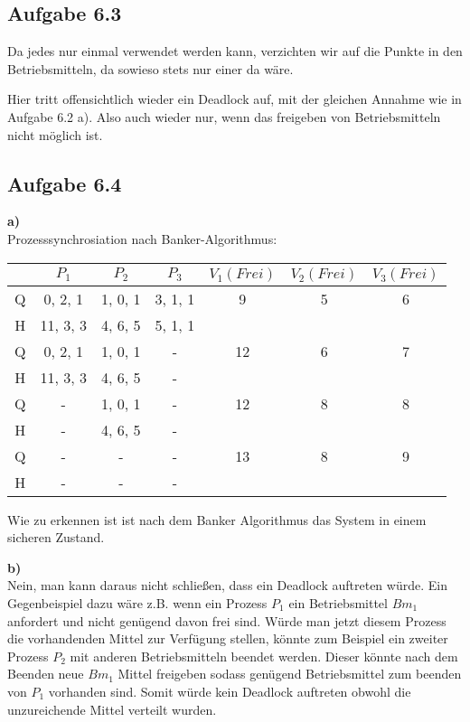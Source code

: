 \documentclass[a4paper,graphics,11pt]{article}
\newcommand{\aufgabe}[1]{\subsection*{Aufgabe #1}}
\begin{document}
\aufgabe{6.3}

Da jedes nur einmal verwendet werden kann, verzichten wir auf die Punkte in den Betriebsmitteln, da sowieso stets nur einer da wäre.


Hier tritt offensichtlich wieder ein Deadlock auf, mit der gleichen Annahme wie in Aufgabe 6.2 a). Also auch wieder nur, wenn das freigeben von Betriebsmitteln nicht möglich ist.
\newpage
\aufgabe{6.4}
\textbf{a)}\\
Prozesssynchrosiation nach Banker-Algorithmus:\\
\begin{tabular}{|c|c|c|c|c|c|c|}\hline
    & $P_1$ & $P_2$ & $P_3$ & $V_1(Frei)$ & $V_2(Frei)$ & $V_3(Frei)$\\ \hline
   Q & 0, 2, 1 & 1, 0, 1 & 3, 1, 1 & 9 & 5 & 6\\
   H & 11, 3, 3 & 4, 6, 5 & 5, 1, 1&&&\\ \hline
   Q & 0, 2, 1 & 1, 0, 1 & - & 12 & 6 & 7\\
   H & 11, 3, 3 & 4, 6, 5 & - &&&\\ \hline
   Q & - & 1, 0, 1 & - & 12 & 8 & 8\\
   H & - & 4, 6, 5 & - &&&\\ \hline
   Q & - & - & - & 13 & 8 & 9\\
   H & - & - & - &&&\\ \hline
\end{tabular}

Wie zu erkennen ist ist nach dem Banker Algorithmus das System in einem sicheren Zustand. 
\newline
\newline

\textbf{b)}\\
Nein, man kann daraus nicht schließen, dass ein Deadlock auftreten würde. Ein Gegenbeispiel dazu wäre z.B. wenn ein Prozess $P_1$ ein Betriebsmittel $Bm_1$ anfordert und nicht genügend davon frei sind. Würde man jetzt diesem Prozess die vorhandenden Mittel zur Verfügung stellen, könnte zum Beispiel ein zweiter Prozess $P_2$ mit anderen Betriebsmitteln beendet werden. Dieser könnte nach dem Beenden neue $Bm_1$ Mittel freigeben sodass genügend Betriebsmittel zum beenden von $P_1$ vorhanden sind. Somit würde kein Deadlock auftreten obwohl die unzureichende Mittel verteilt wurden.
\end{document}
